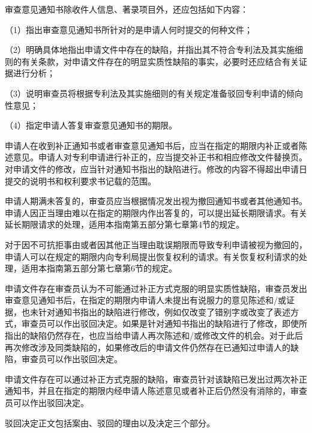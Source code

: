 审查意见通知书除收件人信息、著录项目外，还应包括如下内容：

{\setlength{\parindent}{17.1bp}（1）指出审查意见通知书所针对的是申请人何时提交的何种文件；\par}

{\setlength{\parindent}{17.1bp}（2）明确具体地指出申请文件中存在的缺陷，并指出其不符合专利法及其实施细则的有关条款，对申请文件存在的明显实质性缺陷的事实，必要时还应结合有关证据进行分析；\par}

{\setlength{\parindent}{17.1bp}（3）说明审查员将根据专利法及其实施细则的有关规定准备驳回专利申请的倾向性意见；\par}

{\setlength{\parindent}{17.1bp}（4）指定申请人答复审查意见通知书的期限。\par}

申请人在收到补正通知书或者审查意见通知书后，应当在指定的期限内补正或者陈述意见。申请人对专利申请进行补正的，应当提交补正书和相应修改文件替换页。对申请文件的修改，应当针对通知书指出的缺陷进行。修改的内容不得超出申请日提交的说明书和权利要求书记载的范围。

申请人期满未答复的，审查员应当根据情况发出视为撤回通知书或者其他通知书。申请人因正当理由难以在指定的期限内作出答复的，可以提出延长期限请求。有关延长期限请求的处理，适用本指南第五部分第七章第4节的规定。

对于因不可抗拒事由或者因其他正当理由耽误期限而导致专利申请被视为撤回的，申请人可以在规定的期限内向专利局提出恢复权利的请求。有关恢复权利请求的处理，适用本指南第五部分第七章第6节的规定。

申请文件存在审查员认为不可能通过补正方式克服的明显实质性缺陷，审查员发出审查意见通知书后，在指定的期限内申请人未提出有说服力的意见陈述和/或证据，也未针对通知书指出的缺陷进行修改，例如仅改变了错别字或改变了表述方式，审查员可以作出驳回决定。如果是针对通知书指出的缺陷进行了修改，即使所指出的缺陷仍然存在，也应当给申请人再次陈述和/或修改文件的机会。对于此后再次修改涉及同类缺陷的，如果修改后的申请文件仍然存在已通知过申请人的缺陷，审查员可以作出驳回决定。

申请文件存在可以通过补正方式克服的缺陷，审查员针对该缺陷已发出过两次补正通知书，并且在指定的期限内经申请人陈述意见或者补正后仍然没有消除的，审查员可以作出驳回决定。

驳回决定正文包括案由、驳回的理由以及决定三个部分。

